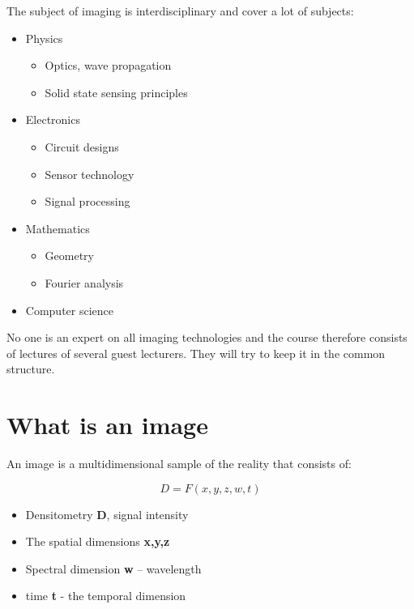 The subject of imaging is interdisciplinary and cover a lot of subjects:

\begin{itemize}
	\item Physics
	\begin{itemize}
		\item Optics, wave propagation
		\item Solid state sensing principles
	\end{itemize}
	\item Electronics
	\begin{itemize}
		\item Circuit designs
		\item Sensor technology
		\item Signal processing
	\end{itemize}
	\item Mathematics
	\begin{itemize}
		\item Geometry
		\item Fourier analysis
	\end{itemize}
	\item Computer science
\end{itemize}

No one is an expert on all imaging technologies and the course therefore consists of lectures of several guest lecturers. They will try to keep it in the common structure. 

\section{What is an image}
An image is a multidimensional sample of the reality that consists of: 

\begin{equation}
D = F(x,y,z,w,t)
\end{equation}

\begin{wbox}{}
\begin{itemize}
	\item Densitometry \textbf{D}, signal intensity
	\item The spatial dimensions \textbf{x,y,z}
	\item Spectral dimension \textbf{w} – wavelength
	\item time \textbf{t} - the temporal dimension 
\end{itemize}
\end{wbox}

